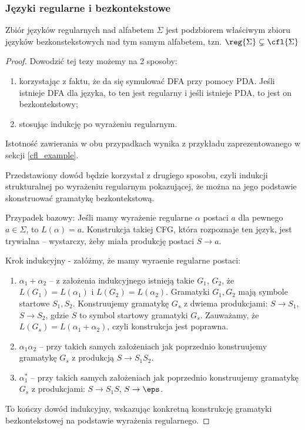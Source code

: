 \subsubsection{Języki regularne i bezkontekstowe}

\begin{theorem}
    Zbiór języków regularnych nad alfabetem \( \Sigma \) jest podzbiorem właściwym zbioru języków bezkonstekstowych nad tym samym alfabetem, tzn. \(\reg{\Sigma} \subsetneq  \cfl{\Sigma}\)
\end{theorem}

\begin{proof}
    Dowodzić tej tezy możemy na 2 sposoby:
    \begin{enumerate}
        \item korzystając z faktu, że da się symulować DFA przy pomocy PDA. Jeśli istnieje DFA dla języka, to ten jest regularny i jeśli istnieje PDA, to jest on bezkontekstowy;
        \item stosując indukcję po wyrażeniu regularnym.
    \end{enumerate}
    Istotność zawierania w obu przypadkach wynika z przykładu zaprezentowanego w sekcji \ref{cfl_example}.
    
    Przedstawiony dowód będzie korzystał z drugiego sposobu, czyli indukcji strukturalnej po wyrażeniu regularnym pokazującej, że można na jego podstawie skonstruować gramatykę bezkontekstową. 
    
    Przypadek bazowy: Jeśli mamy wyrażenie regularne \(\alpha\) postaci \(a\) dla pewnego \(a \in \Sigma\), to \(L(\alpha) = a\). Konstrukcja takiej CFG, która rozpoznaje ten język, jest trywialna -- wystarczy, żeby miała produkcję postaci \(S \rightarrow a\). 
    
    Krok indukcyjny - załóżmy, że mamy wyraenie regularne postaci:    
    \begin{enumerate}
        \item \( \alpha_1 + \alpha_2\) -- z założenia indukcyjnego istnieją takie \(G_1\), \(G_2\), że \(L(G_1) = L(\alpha_1)\) i \(L(G_2) = L(\alpha_2)\). Gramatyki \(G_1, G_2\) mają symbole startowe \(S_1, S_2\). Konstruujemy gramatykę \(G_s\) z dwiema produkcjami: 
        \(S \rightarrow S_1\),  \(S \rightarrow S_2\), gdzie \(S\) to symbol startowy gramatyki \(G_s\). Zauważamy, że \(L(G_s) = L(\alpha_1 + \alpha_2)\), czyli konstrukcja jest poprawna.
        
        \item \( \alpha_1 \alpha_2\) -- przy takich samych założeniach jak poprzednio konstruujemy gramatykę \(G_s\) z produkcją \(S \rightarrow S_1S_2\).
        
        \item \( \alpha_1^*\) -- przy takich samych założeniach jak poprzednio konstruujemy gramatykę \(G_s\) z produkcjami: \( S \rightarrow S_1S\), \( S \rightarrow \eps \).
    \end{enumerate}
    To kończy dowód indukcyjny, wskazując konkretną konstrukcję gramatyki bezkontekstowej na podstawie wyrażenia regularnego.
\end{proof}

